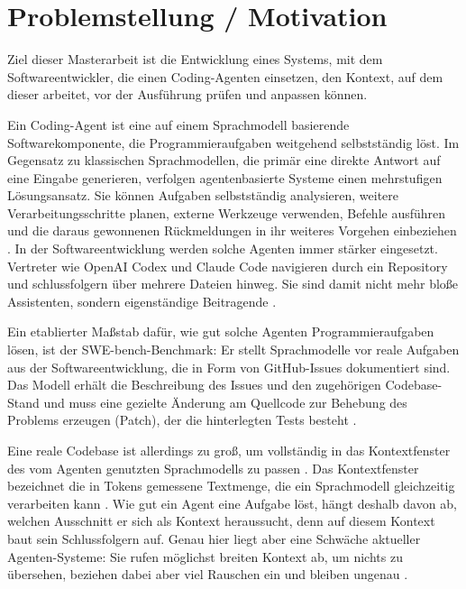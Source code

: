 
\section{Problemstellung / Motivation}

Ziel dieser Masterarbeit ist die Entwicklung eines Systems, mit dem Softwareentwickler, die einen Coding-Agenten einsetzen, den Kontext, auf dem dieser arbeitet, vor der Ausführung prüfen und anpassen können.

Ein Coding-Agent ist eine auf einem Sprachmodell basierende Softwarekomponente, die Programmieraufgaben weitgehend selbstständig löst. Im Gegensatz zu klassischen Sprachmodellen, die primär eine direkte Antwort auf eine Eingabe generieren, verfolgen agentenbasierte Systeme einen mehrstufigen Lösungsansatz. Sie können Aufgaben selbstständig analysieren, weitere Verarbeitungsschritte planen, externe Werkzeuge verwenden, Befehle ausführen und die daraus gewonnenen Rückmeldungen in ihr weiteres Vorgehen einbeziehen \parencite{xia2024agentless}. In der Softwareentwicklung werden solche Agenten immer stärker eingesetzt. Vertreter wie OpenAI Codex und Claude Code navigieren durch ein Repository und schlussfolgern über mehrere Dateien hinweg. Sie sind damit nicht mehr bloße Assistenten, sondern eigenständige Beitragende \parencite{lulla2026agentsmd}.

Ein etablierter Maßstab dafür, wie gut solche Agenten Programmieraufgaben lösen, ist der SWE-bench-Benchmark: Er stellt Sprachmodelle vor reale Aufgaben aus der Softwareentwicklung, die in Form von GitHub-Issues dokumentiert sind. Das Modell erhält die Beschreibung des Issues und den zugehörigen Codebase-Stand und muss eine gezielte Änderung am Quellcode zur Behebung des Problems erzeugen (Patch), der die hinterlegten Tests besteht \parencite{jimenez2024swebench}.

Eine reale Codebase ist allerdings zu groß, um vollständig in das Kontextfenster des vom Agenten genutzten Sprachmodells zu passen \parencite{jimenez2024swebench}. Das Kontextfenster bezeichnet die in Tokens gemessene Textmenge, die ein Sprachmodell gleichzeitig verarbeiten kann \parencite{du2025contextlength}. Wie gut ein Agent eine Aufgabe löst, hängt deshalb davon ab, welchen Ausschnitt er sich als Kontext heraussucht, denn auf diesem Kontext baut sein Schlussfolgern auf. Genau hier liegt aber eine Schwäche aktueller Agenten-Systeme: Sie rufen möglichst breiten Kontext ab, um nichts zu übersehen, beziehen dabei aber viel Rauschen ein und bleiben ungenau \parencite{li2026contextbench}.

